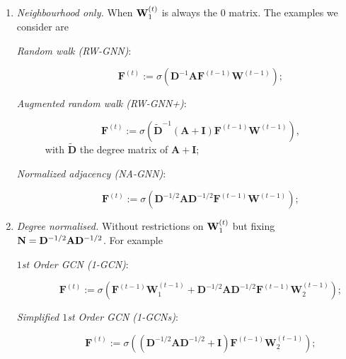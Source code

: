 \begin{enumerate}
 \item \emph{Neighbourhood only.} When $\mathbf{W}_1^{(t)}$ is always the $0$ matrix. The examples we consider are
 \begin{description}
\item[\textit{Random walk (RW-GNN)}:] 
$$
\mathbf{F}^{(t)}:=\sigma\left(\mathbf{D}^{-1}\mathbf{A}\mathbf{F}^{(t-1)}\mathbf{W}^{(t-1)}\right);$$
\item[\textit{Augmented random walk (RW-GNN+)}:] 
$$
\mathbf{F}^{(t)}:=\sigma\left(\tilde{\mathbf{D}}^{-1}(\mathbf{A}+\mathbf{I})\mathbf{F}^{(t-1)}\mathbf{W}^{(t-1)}\right),$$
with $\tilde{\mathbf{D}}$ the degree matrix of $\mathbf{A}+\mathbf{I}$;
\item[\textit{Normalized adjacency (NA-GNN)}:] 
$$
\mathbf{F}^{(t)}:=\sigma\left(\mathbf{D}^{-1/2}\mathbf{A}\mathbf{D}^{-1/2}\mathbf{F}^{(t-1)}\mathbf{W}^{(t-1)}\right)
;$$
\end{description}
\item \emph{Degree normalised.} Without restrictions on $\mathbf{W}_1^{(t)}$ but fixing $\mathbf{N} = \mathbf{D}^{-1/2}\mathbf{A}\mathbf{D}^{-1/2}$. For example
\begin{description}
\item[\textit{$1$st Order GCN (1-GCN)}:]
$$
\mathbf{F}^{(t)}:=\sigma\left(\mathbf{F}^{(t-1)}\mathbf{W}_1^{(t-1)}+\mathbf{D}^{-1/2}\mathbf{A}\mathbf{D}^{-1/2}\mathbf{F}^{(t-1)}\mathbf{W}_2^{(t-1)}\right);$$

\item[\textit{Simplified $1$st Order GCN (1-GCNs)}:]
$$
\mathbf{F}^{(t)}:=\sigma\left((\mathbf{D}^{-1/2}\mathbf{A}\mathbf{D}^{-1/2}+\mathbf{I})\mathbf{F}^{(t-1)}\mathbf{W}_2^{(t-1)}\right);$$
\end{description}


\end{enumerate}
